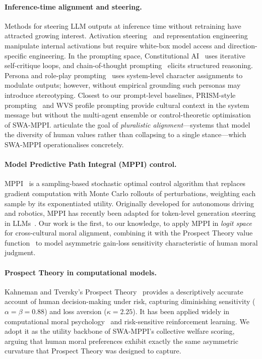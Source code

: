 \documentclass{article}
\begin{document}
\paragraph{Inference-time alignment and steering.}
Methods for steering LLM outputs at inference time without retraining have attracted
growing interest. Activation steering~\citep{arditi2025refusal} and representation
engineering~\citep{zou2023representation} manipulate internal activations but require
white-box model access and direction-specific engineering. In the prompting space,
Constitutional AI~\citep{bai2022constitutional} uses iterative self-critique loops, and
chain-of-thought prompting~\citep{wei2022chain} elicits structured reasoning. Persona
and role-play prompting~\citep{deshpande2023toxicity} uses system-level character
assignments to modulate outputs; however, without empirical grounding such personas
may introduce stereotyping. Closest to our prompt-level baselines, PRISM-style
prompting~\citep{kirk2024prism} and WVS profile prompting provide cultural context in
the system message but without the multi-agent ensemble or control-theoretic optimisation
of SWA-MPPI. \citet{sorensen2024roadmap} articulate the goal of \emph{pluralistic
alignment}---systems that model the diversity of human values rather than collapsing to
a single stance---which SWA-MPPI operationalises concretely.

\paragraph{Model Predictive Path Integral (MPPI) control.}
MPPI~\citep{williams2017mppi} is a sampling-based stochastic optimal control algorithm
that replaces gradient computation with Monte Carlo rollouts of perturbations, weighting
each sample by its exponentiated utility. Originally developed for autonomous driving
and robotics, MPPI has recently been adapted for token-level generation steering in
LLMs~\citep{huang2024mppi}. Our work is the first, to our knowledge, to apply MPPI in
\emph{logit space} for cross-cultural moral alignment, combining it with the
Prospect Theory value function~\citep{kahneman1979prospect} to model asymmetric
gain-loss sensitivity characteristic of human moral judgment.

\paragraph{Prospect Theory in computational models.}
Kahneman and Tversky's Prospect Theory~\citep{kahneman1979prospect} provides a
descriptively accurate account of human decision-making under risk, capturing diminishing
sensitivity ($\alpha=\beta=0.88$) and loss aversion ($\kappa=2.25$). It has been applied
widely in computational moral psychology~\citep{kleiman2017learning} and risk-sensitive
reinforcement learning. We adopt it as the utility backbone of SWA-MPPI's collective
welfare scoring, arguing that human moral preferences exhibit exactly the same asymmetric
curvature that Prospect Theory was designed to capture.
\end{document}
